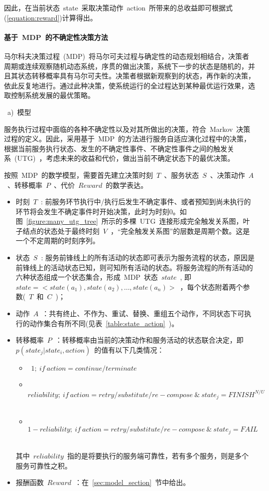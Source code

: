 因此，在当前状态~state~采取决策动作~action~所带来的总收益即可根据式(\ref{equation:reward})计算得出。

\paragraph{基于~MDP~的不确定性决策方法}

马尔科夫决策过程~(MDP)~将马尔可夫过程与确定性的动态规划相结合，决策者周期或连续观察随机动态系统，序贯的做出决策，系统下一步的状态是随机的，并且其状态转移概率具有马尔可夫性。决策者根据新观察到的状态，再作新的决策，依此反复地进行。通过此种决策，使系统运行的全过程达到某种最优运行效果，选取控制系统发展的最优策略。

~a)~{模型}

服务执行过程中面临的各种不确定性以及对其所做出的决策，符合~Markov~决策过程的定义。因此，采用基于~MDP~的方法进行服务自适应演化过程中的决策，根据当前服务执行状态、发生的不确定性事件、不确定性事件之间的触发关系~(UTG)~，考虑未来的收益和代价，做出当前不确定状态下的最优决策。

按照~MDP~的数学模型，需要首先建立决策时刻~$T$~、服务状态~$S$~、决策动作~$A$~、转移概率~$P$~、代价~$Reward$~的数学表达。
\begin{itemize}

\item 时刻~$T$~: 前服务环节执行中/执行后发生不确定事件、或者预知到尚未执行的环节将会发生不确定事件时开始决策，此时为时刻0。如图~\ref{figure:many_utg_tree}~所示的多棵~UTG~连接形成完全触发关系图，叶子结点的状态处于最终时刻~$V$~，“完全触发关系图”的层数是周期个数。这是一个不定周期的时刻序列。

\item 状态~$S$~: 服务前锋线上的所有活动的状态即可表示为服务流程的状态，原因是前锋线上的活动状态已知，则可知所有活动的状态。将服务流程的所有活动的六种状态组成一个状态集合，形成~MDP~状态~$state$~, 即~$state =  < state({a_1}),state({a_2}), \ldots ,state({a_n}) >$~，每个状态附着两个参数(~$T$~和~$C$~)；

\item 动作~$A$~：共有终止、不作为、重试、替换、重组五个动作，不同状态下可执行的动作集合有所不同(见表~\ref{table:state_action}~)。

\item 转移概率~$P$~：转移概率由当前的决策动作和服务活动的状态联合决定，即~$p(state_j|state_i,action)$~的值有以下几类情况：
\begin{itemize}
    \item ~$1;~if~action = continue/terminate$~
    \item ~$reliability;~if~action = retry/substitute/re-compose~ \& ~ state_j = FINIS{H^{N/U}}$~
    \item ~$1 - reliability;~if~action = retry/substitute/re-compose ~\& ~ state_j = FAIL$~
\end{itemize}
其中~$reliability$~指的是将要执行的服务端可靠性，若有多个服务，则是多个服务可靠性之积。

\item 报酬函数~$Reward$~：在~\ref{sec:model_section}~节中给出。

\end{itemize}

